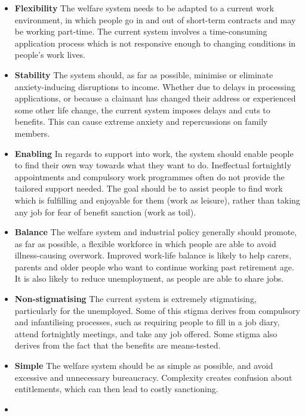 \documentclass[]{tufte-handout}
\providecommand{\tightlist}{%
  \setlength{\itemsep}{0pt}\setlength{\parskip}{0pt}}
\begin{document}
\begin{itemize}
\tightlist
\item
  \textbf{Flexibility} The welfare system needs to be adapted to a
  current work environment, in which people go in and out of short-term
  contracts and may be working part-time. The current system involves a
  time-consuming application process which is not responsive enough to
  changing conditions in people's work lives.\\
\item
  \textbf{Stability} The system should, as far as possible, minimise or
  eliminate anxiety-inducing disruptions to income. Whether due to
  delays in processing applications, or because a claimant has changed
  their address or experienced some other life change, the current
  system imposes delays and cuts to benefits. This can cause extreme
  anxiety and repercussions on family members.
\item
  \textbf{Enabling} In regards to support into work, the system should
  enable people to find their own way towards what they want to do.
  Ineffectual fortnightly appointments and compulsory work programmes
  often do not provide the tailored support needed. The goal should be
  to assist people to find work which is fulfilling and enjoyable for
  them (work as leisure), rather than taking any job for fear of benefit
  sanction (work as toil).
\item
  \textbf{Balance} The welfare system and industrial policy generally
  should promote, as far as possible, a flexible workforce in which
  people are able to avoid illness-causing overwork. Improved work-life
  balance is likely to help carers, parents and older people who want to
  continue working past retirement age. It is also likely to reduce
  unemployment, as people are able to share jobs.
\item
  \textbf{Non-stigmatising} The current system is extremely
  stigmatising, particularly for the unemployed. Some of this stigma
  derives from compulsory and infantilising processes, such as requiring
  people to fill in a job diary, attend fortnightly meetings, and take
  any job offered. Some stigma also derives from the fact that the
  benefits are means-tested.\\
\item
  \textbf{Simple} The welfare system should be as simple as possible,
  and avoid excessive and unnecessary bureaucracy. Complexity creates
  confusion about entitlements, which can then lead to costly
  sanctioning.
\item

\end{itemize}
\end{document}
